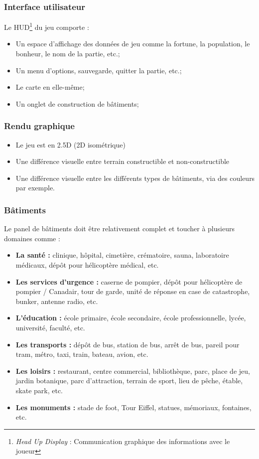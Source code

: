 \documentclass[a4paper,10pt,openany,oneside]{report}
\begin{document}
\subsubsection{Interface utilisateur}
Le HUD\footnote{\textit{Head Up Display} : Communication graphique des informations avec le joueur} du jeu comporte :
\begin{itemize}
\item Un espace d'affichage des données de jeu comme la fortune, la population, le bonheur, le nom de la partie, etc.;
\item Un menu d'options, sauvegarde, quitter la partie, etc.;
\item Le carte en elle-même;
\item Un onglet de construction de bâtiments;
\end{itemize}

\subsubsection{Rendu graphique}
\begin{itemize}
\item Le jeu est en 2.5D (2D isométrique)
\item Une différence visuelle entre terrain constructible et non-constructible
\item Une différence visuelle entre les différents types de bâtiments, via des couleurs par exemple.
\end{itemize}

\subsubsection{Bâtiments}
Le panel de bâtiments doit être relativement complet et toucher à plusieurs domaines comme :
\begin{itemize}
\item \textbf{La santé : }clinique, hôpital, cimetière, crématoire, sauna, laboratoire médicaux, dépôt pour hélicoptère médical, etc.
\item \textbf{Les services d'urgence : }caserne de pompier, dépôt pour hélicoptère de pompier / Canadair, tour de garde, unité de réponse en case de catastrophe, bunker, antenne radio, etc.
\item \textbf{L'éducation : }école primaire, école secondaire, école professionnelle, lycée, université, faculté, etc.
\item \textbf{Les transports : }dépôt de bus, station de bus, arrêt de bus, pareil pour tram, métro, taxi, train, bateau, avion, etc.
\item \textbf{Les loisirs : }restaurant, centre commercial, bibliothèque, parc, place de jeu, jardin botanique, parc d'attraction, terrain de sport, lieu de pêche, étable, skate park, etc.
\item \textbf{Les monuments : }stade de foot, Tour Eiffel, statues, mémoriaux, fontaines, etc.
\end{itemize}
\end{document}
